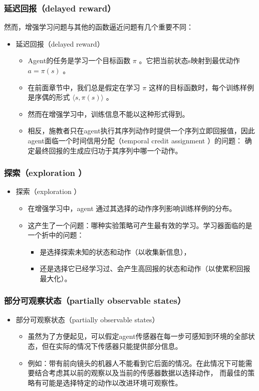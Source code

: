 \documentclass{beamer}
\begin{document}
\begin{frame}
\frametitle{延迟回报（delayed reward）}
\label{sec-1-3}

然而，增强学习问题与其他的函数逼近问题有几个重要不同：
\begin{itemize}
\item 延迟回报（delayed reward）
\begin{itemize}
\item Agent的任务是学习一个目标函数 $\pi$ 。它把当前状态s映射到最优动作 $a=\pi (s)$  。
\item 在前面章节中，我们总是假定在学习 $\pi$ 这样的目标函数时，每个训练样例是序偶的形式  $\langle s,\pi (s)\rangle$ 。
\item 然而在增强学习中，训练信息不能以这种形式得到。
\item 相反，施教者只在agent执行其序列动作时提供一个序列立即回报值，因此agent面临一个时间信用分配（temporal credit assignment ）的问题：
     确定最终回报的生成应归功于其序列中哪一个动作。
\end{itemize}
\end{itemize}
\end{frame}
\begin{frame}
\frametitle{探索（exploration ）}
\label{sec-1-4}

\begin{itemize}
\item 探索（exploration ）
\begin{itemize}
\item 在增强学习中，agent 通过其选择的动作序列影响训练样例的分布。
\item 这产生了一个问题：哪种实验策略可产生最有效的学习。学习器面临的是一个折中的问题：
\begin{itemize}
\item 是选择探索未知的状态和动作（以收集新信息），
\item 还是选择它已经学习过、会产生高回报的状态和动作（以使累积回报最大化）。
\end{itemize}
\end{itemize}
\end{itemize}
\end{frame}
\begin{frame}
\frametitle{部分可观察状态（partially observable states）}
\label{sec-1-5}

\begin{itemize}
\item 部分可观察状态（partially observable states）
\begin{itemize}
\item 虽然为了方便起见，可以假定agent传感器在每一步可感知到环境的全部状态，但在实际的情况下传感器只能提供部分信息。
\item 例如：带有前向镜头的机器人不能看到它后面的情况。在此情况下可能需要结合考虑其以前的观察以及当前的传感器数据以选择动作，
         而最佳的策略有可能是选择特定的动作以改进环境可观察性。
\end{itemize}
\end{itemize}
\end{frame}
\end{document}
